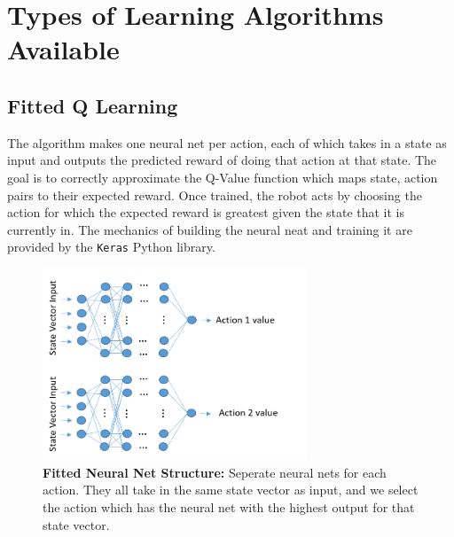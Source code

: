 \documentclass[onecolumn,letterpaper,11pt]{article}
\begin{document}
\section{Types of Learning Algorithms Available}

\subsection{Fitted Q Learning}
The algorithm makes one neural net per action, each of which takes in a state as input and outputs the predicted reward of doing that action at that state. The goal is to correctly approximate the Q-Value function which maps state, action pairs to their expected reward. Once trained, the robot acts by choosing the action for which the expected reward is greatest given the state that it is currently in. The mechanics of building the neural neat and training it are provided by the \texttt{Keras} Python library.

\begin{figure}[H]
	\centering 
	\includegraphics[width=0.7\textwidth]{../images/fittedNet.png}
	\caption{{\bf Fitted Neural Net Structure:} Seperate neural nets for each action. They all take in the same state vector as input, and we select the action which has the neural net with the highest output for that state vector.}
	\label{fig_fitted_net}
\end{figure}
\end{document}
